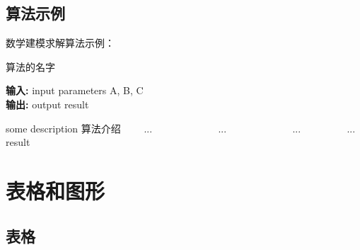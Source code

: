 \documentclass[bwprint]{gmcmthesis}
\begin{document}
\subsection{算法示例}

数学建模求解算法示例：
\begin{center}
\begin{minipage}{0.8\textwidth}
\begin{algorithm}[H]%
\caption{算法的名字} %
{\bf 输入:} %
input parameters A, B, C\\
{\bf 输出:} %
output result
\begin{algorithmic}[1]
\State some description 算法介绍 %
　　\State ...
　　　　\State ...
　　\Else
　　　　\State ...
　　\EndIf
\EndFor
{} %
　　\State ...
\EndWhile
\State \Return result
\end{algorithmic}
\end{algorithm}
\end{minipage}
\end{center}
\vspace{2ex}

\section{表格和图形}

\subsection{表格}

\end{document}
